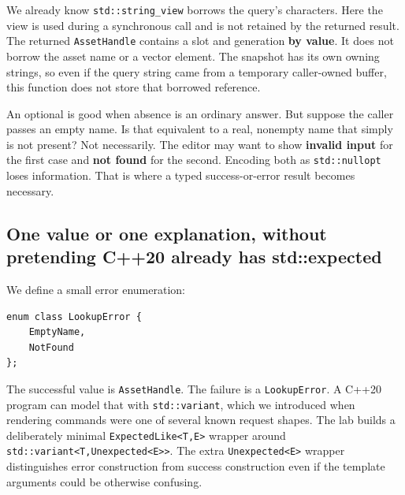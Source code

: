 We already know \texttt{std::string\_view} borrows the query's characters. Here the view is used during a synchronous call and is not retained by the returned result. The returned \texttt{AssetHandle} contains a slot and generation \textbf{by value}. It does not borrow the asset name or a vector element. The snapshot has its own owning strings, so even if the query string came from a temporary caller-owned buffer, this function does not store that borrowed reference.

An optional is good when absence is an ordinary answer. But suppose the caller passes an empty name. Is that equivalent to a real, nonempty name that simply is not present? Not necessarily. The editor may want to show \textbf{invalid input} for the first case and \textbf{not found} for the second. Encoding both as \texttt{std::nullopt} loses information. That is where a typed success-or-error result becomes necessary.

\subsection{One value or one explanation, without pretending C++20 already has std::expected}\label{01-foundations-i-ch006-one-value-or-one-explanation-without-pretending-c20-already-has-stdexpected}

We define a small error enumeration:

\begin{verbatim}
enum class LookupError {
    EmptyName,
    NotFound
};
\end{verbatim}

The successful value is \texttt{AssetHandle}. The failure is a \texttt{LookupError}. A C++20 program can model that with \texttt{std::variant}, which we introduced when rendering commands were one of several known request shapes. The lab builds a deliberately minimal \texttt{ExpectedLike\textless{}T,E\textgreater{}} wrapper around \texttt{std::variant\textless{}T,Unexpected\textless{}E\textgreater{}\textgreater{}}. The extra \texttt{Unexpected\textless{}E\textgreater{}} wrapper distinguishes error construction from success construction even if the template arguments could be otherwise confusing.

